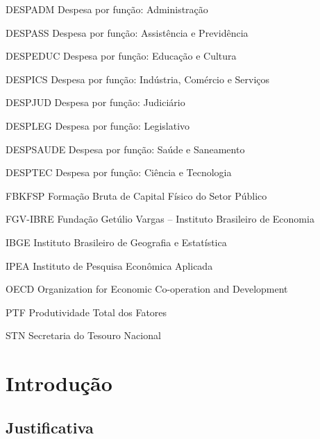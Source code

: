 \documentclass[
  12pt,
  a4paper,
  oneside,
  brazil,
  chapter=TITLE,
  section=TITLE
]{abntex2}
\begin{document}
\begin{siglas}
  \item[DESPADM]   Despesa por função: Administração
  \item[DESPASS]   Despesa por função: Assistência e Previdência
  \item[DESPEDUC]  Despesa por função: Educação e Cultura
  \item[DESPICS]   Despesa por função: Indústria, Comércio e Serviços
  \item[DESPJUD]   Despesa por função: Judiciário
  \item[DESPLEG]   Despesa por função: Legislativo
  \item[DESPSAUDE] Despesa por função: Saúde e Saneamento
  \item[DESPTEC]   Despesa por função: Ciência e Tecnologia
  \item[FBKFSP]    Formação Bruta de Capital Físico do Setor Público
  \item[FGV-IBRE]  Fundação Getúlio Vargas -- Instituto Brasileiro de Economia
  \item[IBGE]      Instituto Brasileiro de Geografia e Estatística
  \item[IPEA]      Instituto de Pesquisa Econômica Aplicada
  \item[OECD]      Organization for Economic Co-operation and Development
  \item[PTF]       Produtividade Total dos Fatores
  \item[STN]       Secretaria do Tesouro Nacional
\end{siglas}

\tableofcontents*
\cleardoublepage

\textual

\chapter{Introdução}

\section{Justificativa}
\end{document}
